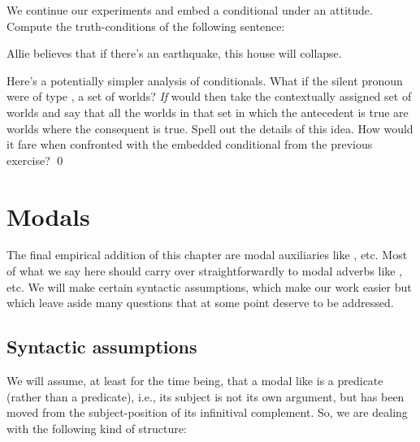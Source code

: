 \begin{exercise}
  We continue our experiments and embed a conditional under an attitude. Compute
  the truth-conditions of the following sentence:

  \ex\label{ex:embedded-if}
  Allie believes that if there's an earthquake, this house will collapse.
  \xe
\end{exercise}

\begin{exercise}
  Here's a potentially simpler analysis of conditionals. What if the silent
  pronoun were of type , a set of worlds? \emph{If}
  would then take the contextually assigned set of worlds and say that all
  the worlds in that set in which the antecedent is true are worlds where the
  consequent is true. Spell out the details of this idea. How would it fare when
  confronted with the embedded conditional  from the
  previous exercise? \qed 
\end{exercise}


\clearpage
\section{Modals}
\label{sec:modals}

The final empirical addition of this chapter are modal auxiliaries like
, etc. Most of what we say here should carry
over straightforwardly to modal adverbs like , etc. We will make certain syntactic assumptions, which make our
work easier but which leave aside many questions that at some point deserve to
be addressed.

\subsection{Syntactic assumptions} \label{sec:synt-assumpt-1}

We will assume, at least for the time being, that a modal like 
is a  predicate (rather than a  predicate), i.e.,
its subject is not its own argument, but has been moved from the
subject-position of its infinitival complement. So, we are dealing with the
following kind of structure:

